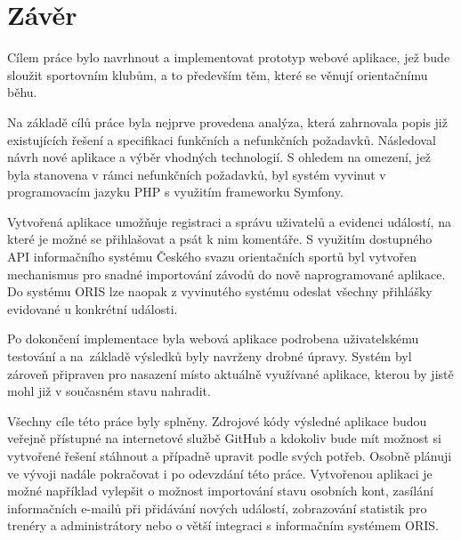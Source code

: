 \chapter{Závěr}

Cílem práce bylo navrhnout a implementovat prototyp webové aplikace, jež bude sloužit sportovním klubům, a to především těm, které se věnují orientačnímu běhu.

Na základě cílů práce byla nejprve provedena analýza, která zahrnovala popis již existujících řešení a specifikaci funkčních a nefunkčních požadavků. Následoval návrh nové aplikace a výběr vhodných technologií. S ohledem na omezení, jež byla stanovena v rámci nefunkčních požadavků, byl systém vyvinut v programovacím jazyku PHP s využitím frameworku Symfony.

Vytvořená aplikace umožňuje registraci a správu uživatelů a evidenci událostí, na které je možné se přihlašovat a psát k nim komentáře. S využitím dostupného API informačního systému Českého svazu orientačních sportů byl vytvořen mechanismus pro snadné importování závodů do nově naprogramované aplikace. Do systému ORIS lze naopak z vyvinutého systému odeslat všechny přihlášky evidované u konkrétní události.

Po dokončení implementace byla webová aplikace podrobena uživatelskému testování a na~základě výsledků byly navrženy drobné úpravy. Systém byl zároveň připraven pro nasazení místo aktuálně využívané aplikace, kterou by jistě mohl již v současném stavu nahradit.

Všechny cíle této práce byly splněny. Zdrojové kódy výsledné aplikace budou veřejně přístupné na internetové službě GitHub a kdokoliv bude mít možnost si vytvořené řešení stáhnout a případně upravit podle svých potřeb. Osobně plánuji ve vývoji nadále pokračovat i po odevzdání této práce. Vytvořenou aplikaci je možné například vylepšit o možnost importování stavu osobních kont, zasílání informačních e-mailů při přidávání nových událostí, zobrazování statistik pro trenéry a administrátory nebo o větší integraci s informačním systémem ORIS.
